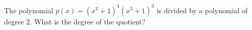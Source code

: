 The polynomial $p(x)=\left(x^2+1\right)^4\left(x^3+1\right)^3$ is divided by a polynomial of degree $2$. What is the degree of the quotient?
